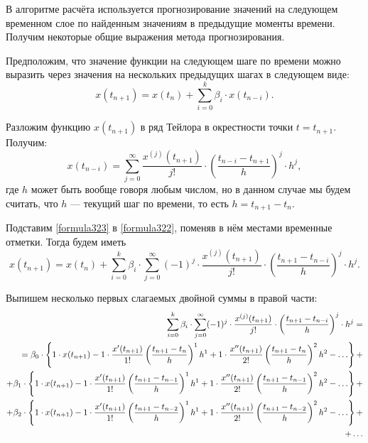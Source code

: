 
В алгоритме расчёта используется прогнозирование значений на следующем временном слое по найденным значениям в предыдущие моменты времени. Получим некоторые общие выражения метода прогнозирования.

Предположим, что значение функции на следующем шаге по времени можно выразить через значения на нескольких предыдущих шагах в следующем виде:
\begin{equation}
\label{formula322}
x(t_{n+1})=x(t_n)+\sum_{i=0}^{k}\beta_i\cdot x(t_{n-i}).
\end{equation}

Разложим функцию $x(t_{n+1})$ в ряд Тейлора в окрестности точки $t=t_{n+1}$. Получим:
\begin{equation}
\label{formula323}
x(t_{n-i})=\sum_{j=0}^{\infty}\frac{x^{(j)}(t_{n+1})}{j!}\cdot \left(\frac{t_{n-i}-t_{n+1}}{h} \right)^j \cdot h^j,
\end{equation}
где $h$ может быть вообще говоря любым числом, но в данном случае мы будем считать, что $h$ --- текущий шаг по времени, то есть $h=t_{n+1}-t_n$.

Подставим \eqref{formula323} в \eqref{formula322}, поменяв в нём местами временные отметки. Тогда будем иметь
\begin{equation}
\label{formula324}
x(t_{n+1})=x(t_n)+\sum_{i=0}^{k}\beta_i\cdot \sum_{j=0}^{\infty} (-1)^j \cdot \frac{x^{(j)}(t_{n+1})}{j!}\cdot \left(\frac{t_{n+1}-t_{n-i}}{h} \right)^j \cdot h^j.
\end{equation}

Выпишем несколько первых слагаемых двойной суммы в правой части:
\begin{align}
\label{formula325}
\sum_{i=0}^{k}\beta_i\cdot \sum_{j=0}^{\infty} (-1)^j \cdot \frac{x^{(j)}(t_{n+1})}{j!}\cdot \left(\frac{t_{n+1}-t_{n-i}}{h} \right)^j \cdot h^j = \notag \\
= \beta_0\cdot \left\{1\cdot x(t_{n+1}) -1\cdot \frac{x'(t_{n+1})}{1!} \left(\frac{t_{n+1}-t_n}{h}\right)^1 h^1 +1\cdot \frac{x''(t_{n+1})}{2!} \left(\frac{t_{n+1}-t_n}{h}\right)^2 h^2-\dots \right\}+ \notag \\
+ \beta_1\cdot \left\{1\cdot x(t_{n+1}) -1\cdot \frac{x'(t_{n+1})}{1!} \left(\frac{t_{n+1}-t_{n-1}}{h}\right)^1 h^1 +1\cdot \frac{x''(t_{n+1})}{2!} \left(\frac{t_{n+1}-t_{n-1}}{h}\right)^2 h^2-\dots \right\}+ \notag \\
+ \beta_2\cdot \left\{1\cdot x(t_{n+1}) -1\cdot \frac{x'(t_{n+1})}{1!} \left(\frac{t_{n+1}-t_{n-2}}{h}\right)^1 h^1 +1\cdot \frac{x''(t_{n+1})}{2!} \left(\frac{t_{n+1}-t_{n-2}}{h}\right)^2 h^2-\dots \right\}+ \notag \\
+ \dots	
\end{align}

